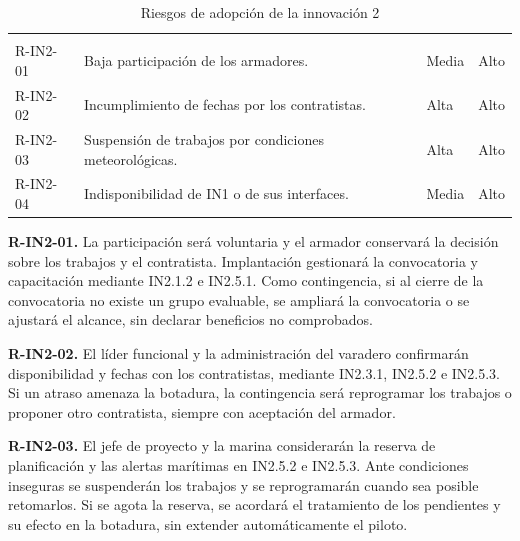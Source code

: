 \begin{longtable}{
L{\tabcolsep\relax}
L{\tabcolsep\relax}
L{\tabcolsep\relax}
L{\tabcolsep\relax}
}
\caption{Riesgos de adopción de la innovación 2}
\label{tab:in2-riesgos}\\
\hline
{} &
 &
 &
 \\
\hline
\endfirsthead
\hline
{} &
 &
 &
 \\
\hline
\endhead

R-IN2-01 & Baja participación de los armadores. & Media & Alto \\
\hline
R-IN2-02 & Incumplimiento de fechas por los contratistas. & Alta & Alto \\
\hline
{}
R-IN2-03 & Suspensión de trabajos por condiciones meteorológicas. & Alta & Alto \\
\hline
R-IN2-04 & Indisponibilidad de IN1 o de sus interfaces. & Media & Alto \\
\hline
\end{longtable}

\textbf{R-IN2-01.}
La participación será voluntaria y el armador conservará la
decisión sobre los trabajos y el contratista. Implantación
gestionará la convocatoria y capacitación mediante IN2.1.2
e IN2.5.1. Como contingencia, si al cierre de la convocatoria
no existe un grupo evaluable, se ampliará la convocatoria o
se ajustará el alcance, sin declarar beneficios no comprobados.

\textbf{R-IN2-02.}
El líder funcional y la administración del varadero confirmarán
disponibilidad y fechas con los contratistas, mediante IN2.3.1,
IN2.5.2 e IN2.5.3. Si un atraso amenaza la botadura, la contingencia
será reprogramar los trabajos o proponer otro contratista,
siempre con aceptación del armador.

\textbf{R-IN2-03.}
El jefe de proyecto y la marina considerarán la reserva de
planificación y las alertas marítimas en IN2.5.2 e IN2.5.3.
Ante condiciones inseguras se suspenderán los trabajos y se
reprogramarán cuando sea posible retomarlos. Si se agota la
reserva, se acordará el tratamiento de los pendientes y su
efecto en la botadura, sin extender automáticamente el piloto.

